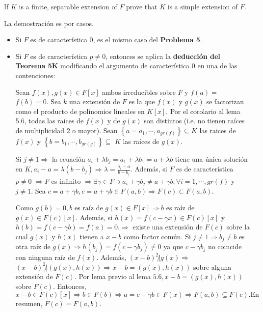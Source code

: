 \begin{problema}[Problema 14]
    If $K$ is a finite, separable extension of $F$ prove that $K$ is a simple extension of $F$.
    \begin{dem}
        La demostración es por casos. 
        \begin{itemize}
            \item Si $F$ es de característica 0, es el mismo caso del \textbf{Problema 5}. 
            \item Si $F$ es de característica $p\neq 0$, entonces se aplica la \textbf{deducción del  Teorema 5K} modificando el argumento de característica 0 en una de las contenciones: 
            
            Sean $f(x), g(x) \in F[x]$ ambos irreducibles sobre $F$ y $f(a)=$ $f(b)=0$. Sea $k$ una extensión de $F$ es la que $f(x)$ y $g(x)$ se factorizan como el producto de polinomios lineales en $K[x]$. Por el corolario al lema 5.6, todas las raíces de $f(x)$ y de $g(x)$ son distintos (i.e. no tienen raíces de multiplicidad 2 o mayor). Sean $\left\{a=a_1, \cdots, a_{g r(f)}\right\} \subseteq K$ las raices de $f(x)$ y $\left\{b=b_1, \cdots, b_{g r(g)}\right\} \subseteq$ $K$ las raíces de $g(x)$.

Si $j \neq 1 \Longrightarrow$ la ecuación $a_i+\lambda b_j=a_1+\lambda b_1=a+\lambda b$ tiene una única solución en $K, a_i-a=\lambda\left(b-b_j\right) \Longrightarrow \lambda=\frac{a_i-a}{b-b_j}$. Además, si $F$ es de característica $p\neq 0$ $\Longrightarrow F$ es infinito $\Longrightarrow \exists \gamma \in F \ni a_i+\gamma b_j \neq a+\gamma b, \forall i=1, \cdots, g r(f)$ y $j \neq 1$. Sea $c=a+\gamma b, c=a+\gamma b \in F(a, b) \Longrightarrow F(c) \subset F(a, b)$.

Como $g(b)=0, b$ es raíz de $g(x) \in F[x] \Longrightarrow b$ es raíz de $g(x) \in F(c)[x]$. Además, si $h(x)=f(c-\gamma x) \in F(c)[x]$ y $h(b)=f(c-\gamma b)=f(a)=0 . \Longrightarrow$ existe una extensión de $F(c)$ sobre la cual $g(x)$ y $h(x)$ tienen a $x-b$ como factor común. Si $j \neq 1 \Longrightarrow b_j \neq b$ es otra raíz de $g(x) \Longrightarrow h\left(b_j\right)=f\left(c-\gamma b_j\right) \neq 0$ ya que $c-\gamma b_j$ no coincide con ninguna raíz de $f(x)$. Además, $(x-b)^2 \not| g(x) \Longrightarrow$ $(x-b)^2 \not|(g(x), h(x)) \Longrightarrow x-b=(g(x), h(x))$ sobre alguna extensión de $F(c)$. Por lema previo al lema $5.6, x-b=(g(x), h(x))$ sobre $F(c)$. Entonces, $x-b \in F(c)[x] \Longrightarrow b \in F(b) \Longrightarrow a=c-\gamma b \in F(x) \Longrightarrow F(a, b) \subseteq F(c) . \mathrm{En}$ resumen, $F(c)=F(a, b)$.

        \end{itemize}
    \end{dem}
\end{problema}

%
%


